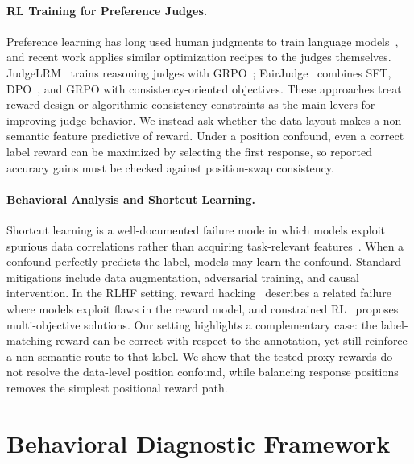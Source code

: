 \documentclass[letterpaper]{article}
\begin{document}
\paragraph{RL Training for Preference Judges.}
Preference learning has long used human judgments to train language models~\citep{christiano2017deep,stiennon2020learning,ouyang2022training,bai2022training}, and recent work applies similar optimization recipes to the judges themselves. JudgeLRM~\citep{chen2025judgelrm} trains reasoning judges with GRPO~\citep{shao2024deepseekmath}; FairJudge~\citep{fairjudge2026} combines SFT, DPO~\citep{rafailov2023direct}, and GRPO with consistency-oriented objectives. These approaches treat reward design or algorithmic consistency constraints as the main levers for improving judge behavior. We instead ask whether the data layout makes a non-semantic feature predictive of reward. Under a position confound, even a correct label reward can be maximized by selecting the first response, so reported accuracy gains must be checked against position-swap consistency.

\paragraph{Behavioral Analysis and Shortcut Learning.}
Shortcut learning is a well-documented failure mode in which models exploit spurious data correlations rather than acquiring task-relevant features~\citep{geirhos2020shortcut,mccoy2019right,tu2020empirical}. When a confound perfectly predicts the label, models may learn the confound. Standard mitigations include data augmentation, adversarial training, and causal intervention. In the RLHF setting, reward hacking~\citep{skalse2022defining,gao2023scaling,pan2024spontaneous} describes a related failure where models exploit flaws in the reward model, and constrained RL~\citep{moskovitz2024confronting} proposes multi-objective solutions. Our setting highlights a complementary case: the label-matching reward can be correct with respect to the annotation, yet still reinforce a non-semantic route to that label. We show that the tested proxy rewards do not resolve the data-level position confound, while balancing response positions removes the simplest positional reward path.

\section{Behavioral Diagnostic Framework}
\end{document}
